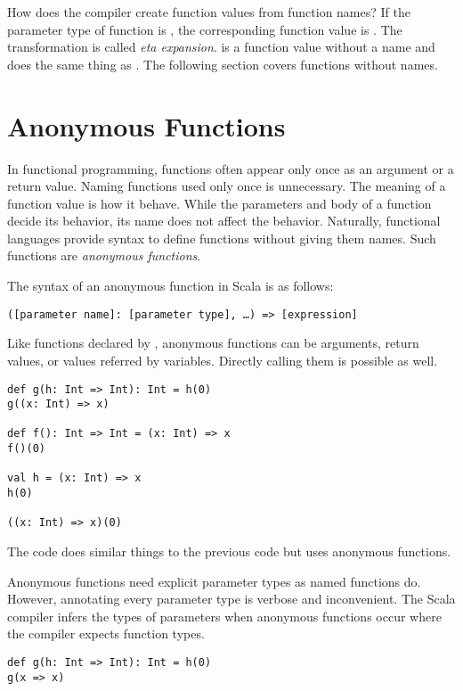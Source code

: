 How does the compiler create function values from function names? If the parameter
type of function  is , the corresponding function value is
. The transformation is called \textit{eta expansion}.
 is a function value without a name and does the same thing as
. The following section covers functions without names.

\section{Anonymous Functions}

In functional programming, functions often appear only once as an argument or a
return value. Naming functions used only once is unnecessary. The meaning of
a function value is how it behave. While the parameters and body of a function
decide its behavior, its name does not affect the behavior. Naturally, functional
languages provide syntax to define functions without giving them names. Such
functions are \textit{anonymous functions}.

The syntax of an anonymous function in Scala is as follows:

\begin{verbatim}
([parameter name]: [parameter type], …) => [expression]
\end{verbatim}

Like functions declared by ,
anonymous functions can be arguments, return values, or values referred by
variables. Directly calling them is possible as well.

\begin{verbatim}
def g(h: Int => Int): Int = h(0)
g((x: Int) => x)

def f(): Int => Int = (x: Int) => x
f()(0)

val h = (x: Int) => x
h(0)

((x: Int) => x)(0)
\end{verbatim}

The code does similar things to the previous code but uses anonymous functions.

Anonymous functions need explicit parameter types as named functions do. However,
annotating every parameter type is verbose and inconvenient. The Scala compiler
infers the types of parameters when anonymous functions occur where the compiler
expects function types.

\begin{verbatim}
def g(h: Int => Int): Int = h(0)
g(x => x)
\end{verbatim}

